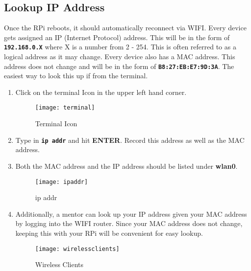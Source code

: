 \documentclass[
a4paper,
fontsize=14pt, %
pagesize, %
parskip=half-, %
]{scrartcl} %
\theoremstyle{mythmstyle} %
\begin{document}
\subsection{Lookup IP Address}
Once the RPi reboots, it should automatically reconnect via WIFI.  Every device gets assigned an IP (Internet Protocol) address.  This will be in the form of \textbf{\texttt{192.168.0.X}} where X is a number from 2 - 254.  This is often referred to as a logical address as it may change.  Every device also has a MAC address.  This address does not change and will be in the form of \textbf{\texttt{B8:27:EB:E7:9D:3A}}.  The easiest way to look this up if from the terminal.
\begin{enumerate}
    \item Click on the terminal Icon in the upper left hand corner.
    
\begin{figure}[h]
    \centering\texttt{[image: terminal]}
    \caption{Terminal Icon}
\end{figure}
    \item Type in \textbf{\texttt{ip addr}} and hit \textbf{ENTER}. Record this address as well as the MAC address.
    \item Both the MAC address and the IP address should be listed under \textbf{wlan0}.
\begin{figure}[h]
    \centering\texttt{[image: ipaddr]}
    \caption{ip addr}
\end{figure}
\clearpage
    \item Additionally, a mentor can look up your IP address given your MAC address by logging into the WIFI router.  Since your MAC address does not change, keeping this with your RPi will be convenient for easy lookup.
    \begin{figure}[h]
        \centering\texttt{[image: wirelessclients]}
        \caption{Wireless Clients}
    \end{figure}
\end{enumerate}

\clearpage
\end{document}
